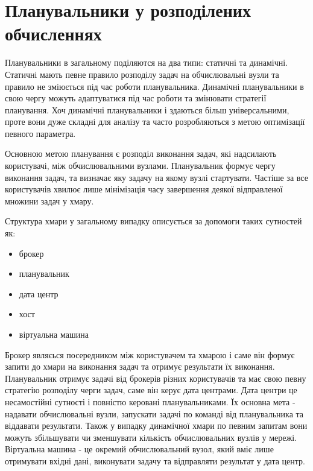 \section{Планувальники у розподілених обчисленнях}

Планувальники в загальному поділяются на два типи: статичні та динамічні. Статичні мають певне правило розподілу задач на обчислювальні вузли та правило не зміюється під час роботи планувальника. Динамічні планувальники в свою чергу можуть адаптуватися під час роботи та змінювати стратегії планування. Хоч динамічні планувальники і здаються більш універсальними, проте вони дуже складні для аналізу та часто розробляються з метою оптимізації певного параметра.

Основною метою планування є розподіл виконання задач, які надсилають користувачі, між обчислювальними вузлами. Планувальник формує чергу виконання задач, та визначає яку задачу на якому вузлі стартувати. Частіше за все користувачів хвилює лише мінімізація часу завершення деякої відправленої множини задач у хмару.

Структура хмари у загальному випадку описується за допомоги таких сутностей як:
\begin{itemize}
	\item брокер
	\item планувальник
	\item дата центр
	\item хост
	\item віртуальна машина
\end{itemize}

Брокер являєься посередником між користувачем та хмарою і саме він формує запити до хмари на виконання задач та отримує результати їх виконання. Планувальник отримує задачі від брокерів різних користувачів та має свою певну стратегію розподілу черги задач, саме він керує дата центрами. Дата центри це несамостійні сутності і повністю керовані планувальниками. Їх основна мета - надавати обчислювальні вузли, запускати задачі по команді від планувальника та віддавати результати. Також у випадку динамічної хмари по певним запитам вони можуть збільшувати чи зменшувати кількість обчислювальних вузлів у мережі.
Віртуальна машина - це окремий обчислювальний вузол, який вміє лише отримувати вхідні дані, виконувати задачу та відправляти результат у дата центр.

